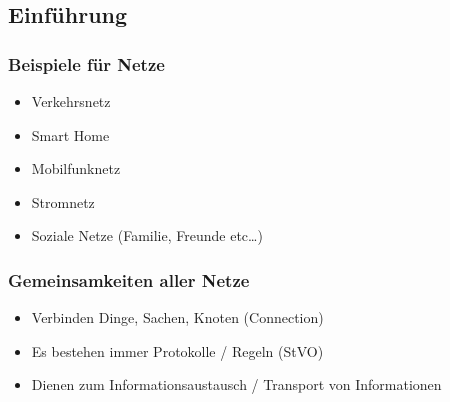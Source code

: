 \documentclass[12pt,a4paper]{article}
\begin{document}
	\subsection{Einführung}
		\subsubsection{Beispiele für Netze}
			\begin{itemize}
				\item Verkehrsnetz
				\item Smart Home
				\item Mobilfunknetz
				\item Stromnetz
				\item Soziale Netze (Familie, Freunde etc\dots)
			\end{itemize}
			
\subsubsection{Gemeinsamkeiten aller Netze}
	\begin{itemize}
		\item Verbinden Dinge, Sachen, Knoten (Connection)
		\item Es bestehen immer Protokolle / Regeln (StVO)
		\item Dienen zum Informationsaustausch / Transport von Informationen
	\end{itemize}
\end{document}
